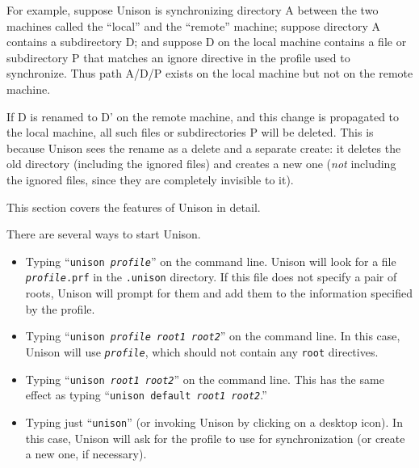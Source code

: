 \documentclass{article}
\newcommand{\NT}[1]{\textit{#1}}
\begin{document}
\begin{itemize}
For example, suppose Unison is synchronizing directory A between the two
machines called the ``local'' and the ``remote'' machine; suppose directory
A contains a subdirectory D; and suppose D on the local machine contains a
file or subdirectory P that matches an ignore directive in the profile used
to synchronize. Thus path A/D/P exists on the local machine but not on the
remote machine.

 If D is renamed to D' on the remote machine, and this change is
 propagated to the local machine, all such files or subdirectories P
 will be deleted.  This is because Unison sees the rename as a delete and a
 separate create: it deletes the old directory (including the ignored files)
 and creates a new one ({\em not} including the ignored files, since they
 are completely invisible to it).
\end{itemize}




This section covers the features of Unison in detail.


There are several ways to start Unison.
\begin{itemize}
\item Typing ``{\tt unison \NT{profile}}'' on the command line.  Unison
will look for a file \texttt{\NT{profile}.prf} in the \verb|.unison|
directory.  If this file does not specify a pair of roots, Unison will
prompt for them and add them to the information specified by the profile.
\item Typing ``{\tt unison \NT{profile} \NT{root1} \NT{root2}}'' on the command
line.
In this case, Unison will use {\tt \NT{profile}}, which should not contain
any {\tt root} directives.
\item Typing ``{\tt unison \NT{root1} \NT{root2}}'' on the command line.  This
has the same effect as typing ``{\tt unison default \NT{root1} \NT{root2}}.''
\item Typing just ``{\tt unison}'' (or invoking Unison by clicking on
a desktop icon).  In this case, Unison will ask for the profile to use
for synchronization (or create a new one, if necessary).
\end{itemize}


\end{document}
